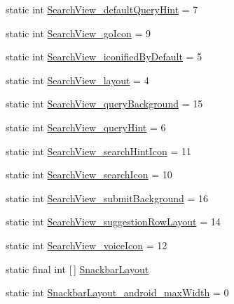 \begin{DoxyCompactItemize}
static int \hyperlink{classandroid_1_1support_1_1v7_1_1cardview_1_1R_1_1styleable_a66b7049f102d587dd7b8ce1ae08d136e}{Search\+View\+\_\+default\+Query\+Hint} = 7
\item 
static int \hyperlink{classandroid_1_1support_1_1v7_1_1cardview_1_1R_1_1styleable_ae419f144558b1d2950fe533ade9e622a}{Search\+View\+\_\+go\+Icon} = 9
\item 
static int \hyperlink{classandroid_1_1support_1_1v7_1_1cardview_1_1R_1_1styleable_ae4178ec746e562d89135b15a735ff968}{Search\+View\+\_\+iconified\+By\+Default} = 5
\item 
static int \hyperlink{classandroid_1_1support_1_1v7_1_1cardview_1_1R_1_1styleable_afaa092a1521b8271596ff81f5a983464}{Search\+View\+\_\+layout} = 4
\item 
static int \hyperlink{classandroid_1_1support_1_1v7_1_1cardview_1_1R_1_1styleable_ae43f966eb36b57de8bdb6ddadf0097ad}{Search\+View\+\_\+query\+Background} = 15
\item 
static int \hyperlink{classandroid_1_1support_1_1v7_1_1cardview_1_1R_1_1styleable_a8a00434d6e5e7c5f1d6407571e139641}{Search\+View\+\_\+query\+Hint} = 6
\item 
static int \hyperlink{classandroid_1_1support_1_1v7_1_1cardview_1_1R_1_1styleable_a6f8fc657ddfa535ada1e5e37d0a4c369}{Search\+View\+\_\+search\+Hint\+Icon} = 11
\item 
static int \hyperlink{classandroid_1_1support_1_1v7_1_1cardview_1_1R_1_1styleable_a1e912bff6dbc1cd9b21249197e9e3d89}{Search\+View\+\_\+search\+Icon} = 10
\item 
static int \hyperlink{classandroid_1_1support_1_1v7_1_1cardview_1_1R_1_1styleable_a7d4e946a7b0ee85b63f28d0ee6b9afde}{Search\+View\+\_\+submit\+Background} = 16
\item 
static int \hyperlink{classandroid_1_1support_1_1v7_1_1cardview_1_1R_1_1styleable_a97ae2d4d4adca4dd298ad724f0819aac}{Search\+View\+\_\+suggestion\+Row\+Layout} = 14
\item 
static int \hyperlink{classandroid_1_1support_1_1v7_1_1cardview_1_1R_1_1styleable_af547d6c74440f698844627ab90d35a40}{Search\+View\+\_\+voice\+Icon} = 12
\item 
static final int \mbox{[}$\,$\mbox{]} \hyperlink{classandroid_1_1support_1_1v7_1_1cardview_1_1R_1_1styleable_aab664bb57daef291febbbab9c49f8fbf}{Snackbar\+Layout}
\item 
static int \hyperlink{classandroid_1_1support_1_1v7_1_1cardview_1_1R_1_1styleable_a905053a7c2becdfc55ac2369107505e1}{Snackbar\+Layout\+\_\+android\+\_\+max\+Width} = 0

\end{DoxyCompactItemize}
